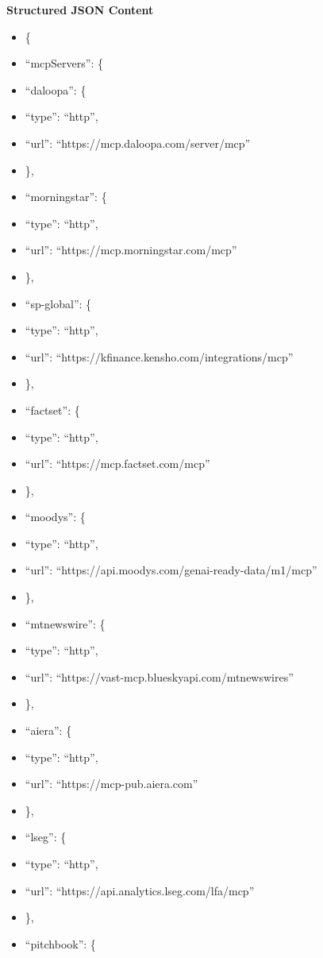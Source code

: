 \documentclass[11pt]{article}
\begin{document}
\textbf{Structured JSON Content}
\begin{itemize}[leftmargin=*,itemsep=2pt,topsep=2pt]
\item {} \{
\item {} ``mcpServers'': \{
\item {} ``daloopa'': \{
\item {} ``type'': ``http'',
\item {} ``url'': ``https://mcp.daloopa.com/server/mcp''
\item {} \},
\item {} ``morningstar'': \{
\item {} ``type'': ``http'',
\item {} ``url'': ``https://mcp.morningstar.com/mcp''
\item {} \},
\item {} ``sp-global'': \{
\item {} ``type'': ``http'',
\item {} ``url'': ``https://kfinance.kensho.com/integrations/mcp''
\item {} \},
\item {} ``factset'': \{
\item {} ``type'': ``http'',
\item {} ``url'': ``https://mcp.factset.com/mcp''
\item {} \},
\item {} ``moodys'': \{
\item {} ``type'': ``http'',
\item {} ``url'': ``https://api.moodys.com/genai-ready-data/m1/mcp''
\item {} \},
\item {} ``mtnewswire'': \{
\item {} ``type'': ``http'',
\item {} ``url'': ``https://vast-mcp.blueskyapi.com/mtnewswires''
\item {} \},
\item {} ``aiera'': \{
\item {} ``type'': ``http'',
\item {} ``url'': ``https://mcp-pub.aiera.com''
\item {} \},
\item {} ``lseg'': \{
\item {} ``type'': ``http'',
\item {} ``url'': ``https://api.analytics.lseg.com/lfa/mcp''
\item {} \},
\item {} ``pitchbook'': \{

\end{itemize}
\end{document}
